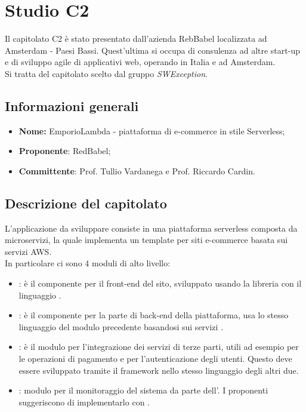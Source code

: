 \section{Studio C2}
Il capitolato C2 è stato presentato dall'azienda RebBabel localizzata ad Amsterdam - Paesi Bassi. Quest'ultima si occupa di consulenza ad altre start-up e di sviluppo agile di applicativi web, operando in Italia e ad Amsterdam.\\
Si tratta del capitolato scelto dal gruppo \textit{SWException}.

\subsection{Informazioni generali}
\begin{itemize}
	\item \textbf{Nome:} EmporioLambda - piattaforma di e-commerce in stile Serverless;
	\item \textbf{Proponente}: RedBabel;
	\item \textbf{Committente}: Prof. Tullio Vardanega e Prof. Riccardo Cardin.
\end{itemize}

\subsection{Descrizione del capitolato}
L'applicazione da sviluppare consiste in una piattaforma serverless composta da microservizi, la quale implementa un template per siti e-commerce basata sui servizi AWS.\\
In particolare ci sono 4 moduli di alto livello:
\begin{itemize}
	\item {}: è il componente per il front-end del sito, sviluppato usando la libreria \textit{} con il linguaggio \textit{}.
	\item {}: è il componente per la parte di back-end della piattaforma, usa lo stesso linguaggio del modulo precedente basandosi sui servizi \textit{}.
	\item {}: è il modulo per l'integrazione dei servizi di terze parti, utili ad esempio per le operazioni di pagamento e per l'autenticazione degli utenti. Questo deve essere sviluppato tramite il \textit{} framework nello stesso linguaggio degli altri due.
	\item {}: modulo per il monitoraggio del sistema da parte dell'. I proponenti suggeriscono di implementarlo con \textit{}.
\end{itemize}

